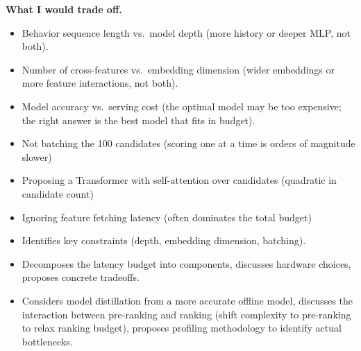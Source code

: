 \begin{interviewq}
\textbf{What I would trade off.}
\begin{itemize}
    \item Behavior sequence length vs.\ model depth (more history or deeper MLP, not both).
    \item Number of cross-features vs.\ embedding dimension (wider embeddings or more feature interactions, not both).
    \item Model accuracy vs.\ serving cost (the optimal model may be too expensive; the right answer is the best model that fits in budget).
\end{itemize}

\redflags
\begin{itemize}
    \item Not batching the 100 candidates (scoring one at a time is orders of magnitude slower)
    \item Proposing a Transformer with self-attention over candidates (quadratic in candidate count)
    \item Ignoring feature fetching latency (often dominates the total budget)
\end{itemize}


\goodgreat
\begin{itemize}
    \item {} Identifies key constraints (depth, embedding dimension, batching).
    \item {} Decomposes the latency budget into components, discusses hardware choices, proposes concrete tradeoffs.
    \item {} Considers model distillation from a more accurate offline model, discusses the interaction between pre-ranking and ranking (shift complexity to pre-ranking to relax ranking budget), proposes profiling methodology to identify actual bottlenecks.
\end{itemize}

\end{interviewq}

